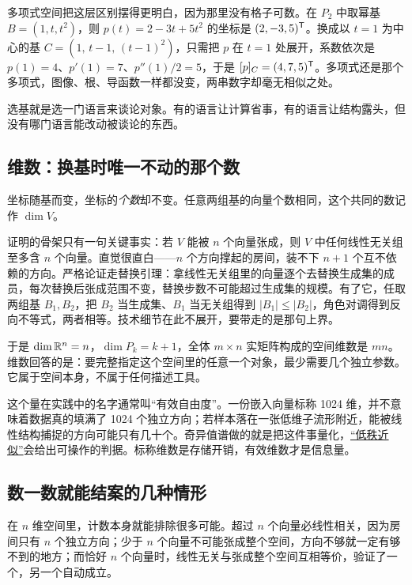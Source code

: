 多项式空间把这层区别摆得更明白，因为那里没有格子可数。在 \(P_2\) 中取幂基 \(B=(1,t,t^2)\)，则 \(p(t)=2-3t+5t^2\) 的坐标是 \((2,-3,5)^{\mathsf{T}}\)。换成以 \(t=1\) 为中心的基 \(C=(1,\,t-1,\,(t-1)^2)\)，只需把 \(p\) 在 \(t=1\) 处展开，系数依次是 \(p(1)=4\)、\(p'(1)=7\)、\(p''(1)/2=5\)，于是 \([p]_C=(4,7,5)^{\mathsf{T}}\)。多项式还是那个多项式，图像、根、导函数一样都没变，两串数字却毫无相似之处。

选基就是选一门语言来谈论对象。有的语言让计算省事，有的语言让结构露头，但没有哪门语言能改动被谈论的东西。

\subsection{维数：换基时唯一不动的那个数}

坐标随基而变，坐标的\emph{个数}却不变。任意两组基的向量个数相同，这个共同的数记作 \(\dim V\)。

证明的骨架只有一句关键事实：若 \(V\) 能被 \(n\) 个向量张成，则 \(V\) 中任何线性无关组至多含 \(n\) 个向量。直觉很直白——\(n\) 个方向撑起的房间，装不下 \(n+1\) 个互不依赖的方向。严格论证走替换引理：拿线性无关组里的向量逐个去替换生成集的成员，每次替换后张成范围不变，替换步数不可能超过生成集的规模。有了它，任取两组基 \(B_1,B_2\)，把 \(B_2\) 当生成集、\(B_1\) 当无关组得到 \(|B_1|\le|B_2|\)，角色对调得到反向不等式，两者相等。技术细节在此不展开，要带走的是那句上界。

于是 \(\dim\mathbb{R}^n=n\)，\(\dim P_k=k+1\)，全体 \(m\times n\) 实矩阵构成的空间维数是 \(mn\)。维数回答的是：要完整指定这个空间里的任意一个对象，最少需要几个独立参数。它属于空间本身，不属于任何描述工具。

这个量在实践中的名字通常叫``有效自由度''。一份嵌入向量标称 1024 维，并不意味着数据真的填满了 1024 个独立方向；若样本落在一张低维子流形附近，能被线性结构捕捉的方向可能只有几十个。奇异值谱做的就是把这件事量化，\hyperref[sec:03-Linear-Algebra/07-SVD-and-Data-Applications/03]{``低秩近似''}会给出可操作的判据。标称维数是存储开销，有效维数才是信息量。

\subsection{数一数就能结案的几种情形}

在 \(n\) 维空间里，计数本身就能排除很多可能。超过 \(n\) 个向量必线性相关，因为房间只有 \(n\) 个独立方向；少于 \(n\) 个向量不可能张成整个空间，方向不够就一定有够不到的地方；而恰好 \(n\) 个向量时，线性无关与张成整个空间互相等价，验证了一个，另一个自动成立。

